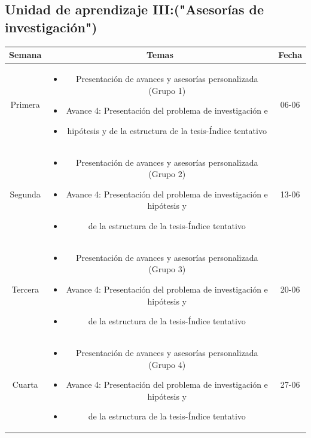 \documentclass[a4paper]{article}
\begin{document}
\subsection{Unidad de aprendizaje III:("Asesorías de investigación")}
\begin{table}[ht]
\centering
\begin{tabular}{|c|c|c|}
\hline
\textbf{Semana} & \textbf{Temas} & \textbf{Fecha} \\ 
\hline
Primera 
& \begin{minipage}[t]{10cm}
\begin{itemize}
\item Presentación de avances y asesorías personalizada (Grupo 1)
\item Avance 4: Presentación del problema de investigación e
\item hipótesis y de la estructura de la tesis-Índice tentativo
\end{itemize}
\end{minipage} & 06-06\\ 
\hline 
Segunda 
& \begin{minipage}[t]{10cm}
\begin{itemize}
\item Presentación de avances y asesorías personalizada (Grupo 2)
\item Avance 4: Presentación del problema de investigación e hipótesis y
\item de la estructura de la tesis-Índice tentativo
\end{itemize}
\end{minipage} & 13-06\\ 
\hline 
Tercera 
& \begin{minipage}[t]{10cm}
\begin{itemize}
\item Presentación de avances y asesorías personalizada (Grupo 3)
\item Avance 4: Presentación del problema de investigación e hipótesis y
\item de la estructura de la tesis-Índice tentativo
\end{itemize}
\end{minipage} & 20-06 \\ 
\hline 
Cuarta 
& \begin{minipage}[t]{10cm}
\begin{itemize}
\item Presentación de avances y asesorías personalizada (Grupo 4)
\item Avance 4: Presentación del problema de investigación e hipótesis y
\item de la estructura de la tesis-Índice tentativo
\end{itemize}
\end{minipage} & 27-06 \\ 
\hline 
\end{tabular}
\end{table}
\newpage
\end{document}
